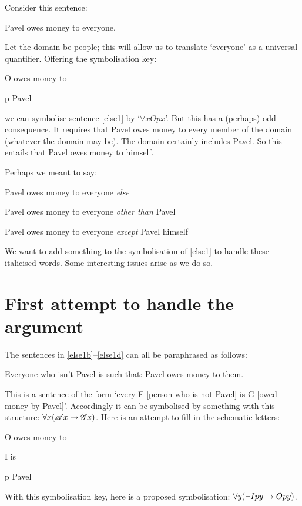 Consider this sentence:
\begin{earg}
\item[\ex{else1}] Pavel owes money to everyone.
\end{earg}
Let the domain be people; this will allow us to translate `everyone' as a universal quantifier. Offering the symbolisation key:
	\begin{ekey}
		\item[O]  owes money to 
		\item[p] Pavel
	\end{ekey}
we can symbolise sentence \ref{else1} by `$\forall x Opx$'. But this has a (perhaps) odd consequence. It requires that Pavel owes money to every member of the domain (whatever the domain may be). The domain certainly includes Pavel. So this entails that Pavel owes money to himself. 

Perhaps we meant to say:
	\begin{earg}
		\item[\ex{else1b}] Pavel owes money to everyone \emph{else}
		\item[\ex{else1c}] Pavel owes money to everyone \emph{other than} Pavel
		\item[\ex{else1d}] Pavel owes money to everyone \emph{except} Pavel himself
	\end{earg}
We want to add something to the symbolisation of \ref{else1} to handle these italicised words. Some interesting issues arise as we do so.


\section{First attempt to handle the argument}

The sentences in \ref{else1b}–\ref{else1d} can all be paraphrased as follows:
\begin{earg}
	\item[\ex{else1e}] Everyone who isn't Pavel is such that: Pavel owes money to them.
\end{earg} This is a sentence of the form `every F [person who is not Pavel] is G [owed money by Pavel]'. Accordingly it can be symbolised by something with this structure: $\forall x (\mathscr{A}x \rightarrow \mathscr{G}x)$. Here is an attempt to fill in the schematic letters:
	\begin{ekey}
		\item[O]  owes money to \gap{2}
		\item[I]  is \gap{2}
		\item[p] Pavel
	\end{ekey}
With this symbolisation  key, here is a proposed symbolisation: $\forall y (\neg Ipy \rightarrow Opy)$. 

